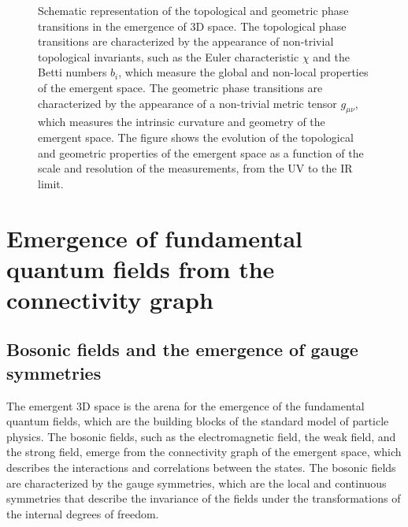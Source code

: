 \begin{figure}[h]
    \centering
    \caption{Schematic representation of the topological and geometric phase transitions in the emergence of 3D space. The topological phase transitions are characterized by the appearance of non-trivial topological invariants, such as the Euler characteristic $\chi$ and the Betti numbers $b_i$, which measure the global and non-local properties of the emergent space. The geometric phase transitions are characterized by the appearance of a non-trivial metric tensor $g_{\mu\nu}$, which measures the intrinsic curvature and geometry of the emergent space. The figure shows the evolution of the topological and geometric properties of the emergent space as a function of the scale and resolution of the measurements, from the UV to the IR limit.}
    \label{fig:topological_phases}
\end{figure}

\section{Emergence of fundamental quantum fields from the connectivity graph}
\subsection{Bosonic fields and the emergence of gauge symmetries}
The emergent 3D space is the arena for the emergence of the fundamental quantum fields, which are the building blocks of the standard model of particle physics. The bosonic fields, such as the electromagnetic field, the weak field, and the strong field, emerge from the connectivity graph of the emergent space, which describes the interactions and correlations between the states. The bosonic fields are characterized by the gauge symmetries, which are the local and continuous symmetries that describe the invariance of the fields under the transformations of the internal degrees of freedom.

